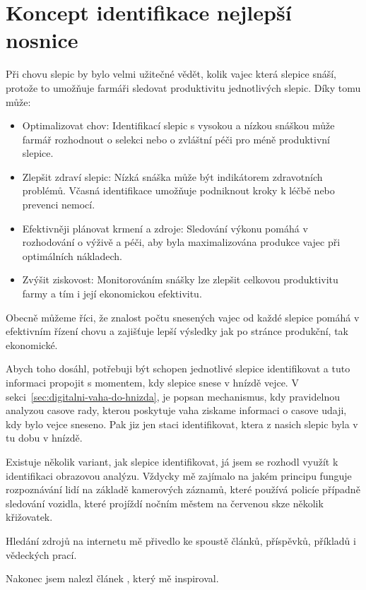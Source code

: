 \section{Koncept identifikace nejlepší nosnice}\label{sec:koncept-identifikace-nejlepsi-nosnice}

Při chovu slepic by bylo velmi užitečné vědět, kolik vajec která slepice snáší, protože to umožňuje farmáři sledovat produktivitu jednotlivých slepic.
Díky tomu může:
\begin{itemize}
    \item Optimalizovat chov: Identifikací slepic s vysokou a nízkou snáškou může farmář rozhodnout o selekci nebo o zvláštní péči pro méně produktivní slepice.
    \item Zlepšit zdraví slepic: Nízká snáška může být indikátorem zdravotních problémů.
    Včasná identifikace umožňuje podniknout kroky k léčbě nebo prevenci nemocí.
    \item Efektivněji plánovat krmení a zdroje: Sledování výkonu pomáhá v rozhodování o výživě a péči, aby byla maximalizována produkce vajec při optimálních nákladech.
    \item Zvýšit ziskovost: Monitorováním snášky lze zlepšit celkovou produktivitu farmy a tím i její ekonomickou efektivitu.
\end{itemize}

Obecně můžeme říci, že znalost počtu snesených vajec od každé slepice pomáhá v efektivním řízení chovu a zajišťuje lepší výsledky jak po stránce produkční, tak ekonomické.

Abych toho dosáhl, potřebuji být schopen jednotlivé slepice identifikovat a tuto informaci propojit s momentem, kdy slepice snese v hnízdě vejce.
V sekci~\ref{sec:digitalni-vaha-do-hnizda}, je popsan mechanismus, kdy pravidelnou analyzou casove rady, kterou poskytuje vaha ziskame informaci o casove udaji, kdy bylo vejce sneseno.
Pak jiz jen staci identifikovat, ktera z nasich slepic byla v tu dobu v hnízdě.

Existuje několik variant, jak slepice identifikovat, já jsem se rozhodl využít k identifikaci obrazovou analýzu.
Vždycky mě zajímalo na jakém principu funguje rozpoznávání lidí na základě kamerových záznamů, které používá policíe případně sledování vozidla, které projíždí nočním městem na červenou skze několik křižovatek.

Hledání zdrojů na internetu mě přivedlo ke spoustě článků, příspěvků, příkladů i vědeckých prací.

Nakonec jsem nalezl článek \cite{medium-person-reidentification}, který mě inspiroval.


